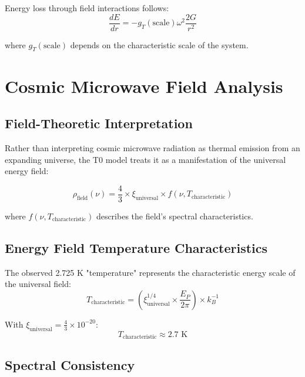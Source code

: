 \documentclass[12pt,a4paper]{article}
\begin{document}
	Energy loss through field interactions follows:
	\begin{equation}
		\frac{dE}{dr} = -g_T(\text{scale}) \omega^2 \frac{2G}{r^2}
	\end{equation}
	
	where $g_T(\text{scale})$ depends on the characteristic scale of the system.
	
	\section{Cosmic Microwave Field Analysis}
	\label{sec:cmb_analysis}
	
	\subsection{Field-Theoretic Interpretation}
	\label{subsec:field_interpretation}
	
	Rather than interpreting cosmic microwave radiation as thermal emission from an expanding universe, the T0 model treats it as a manifestation of the universal energy field:
	
	\begin{equation}
		\rho_{\text{field}}(\nu) = \frac{4}{3} \times \xi_{\text{universal}} \times f(\nu, T_{\text{characteristic}})
	\end{equation}
	
	where $f(\nu, T_{\text{characteristic}})$ describes the field's spectral characteristics.
	
	\subsection{Energy Field Temperature Characteristics}
	\label{subsec:energy_temperature}
	
	The observed 2.725 K "temperature" represents the characteristic energy scale of the universal field:
	\begin{equation}
		T_{\text{characteristic}} = \left(\xi_{\text{universal}}^{1/4} \times \frac{E_P}{2\pi}\right) \times k_B^{-1}
	\end{equation}
	
	With $\xi_{\text{universal}} = \frac{4}{3} \times 10^{-20}$:
	\begin{equation}
		T_{\text{characteristic}} \approx 2.7 \text{ K}
	\end{equation}
	
	\subsection{Spectral Consistency}
	\label{subsec:spectral_consistency}
	
\end{document}

